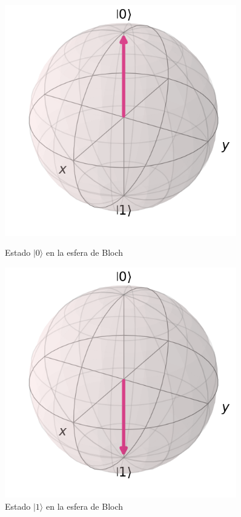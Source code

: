 \documentclass{article}
\numberwithin{equation}{section} %
\begin{document}
    \begin{figure}[h!]
        \centering
        \begin{minipage}[b]{0.4\textwidth}
            \centering
            \includegraphics[width=0.9\textwidth]{img/Bloch/bloch_state_0.png}
            \caption{Estado $|0\rangle$ en la esfera de Bloch}\label{fig: bloch0}
        \end{minipage}
        \hspace{0.05\textwidth}
        \begin{minipage}[b]{0.4\textwidth}
            \centering
            \includegraphics[width=0.9\textwidth]{img/Bloch/bloch_state_1.png}
            \caption{Estado $|1\rangle$ en la esfera de Bloch}\label{fig: bloch1}
        \end{minipage}
    
    \end{figure}
\end{document}
